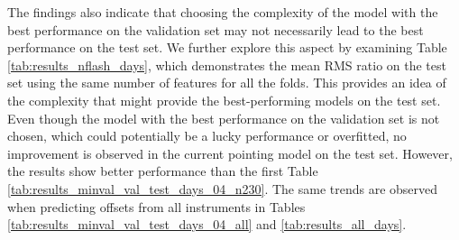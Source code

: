 The findings also indicate that choosing the complexity of the model with the best performance on the validation set may not necessarily lead to the best performance on the test set.
We further explore this aspect by examining Table \ref{tab:results_nflash_days}, which demonstrates the mean RMS ratio on the test set using the same number of features for all the folds.
This provides an idea of the complexity that might provide the best-performing models on the test set.
Even though the model with the best performance on the validation set is not chosen, which could potentially be a lucky performance or overfitted,
no improvement is observed in the current pointing model on the test set.
However, the results show better performance than the first Table \ref{tab:results_minval_val_test_days_04_n230}.
The same trends are observed when predicting offsets from all instruments in Tables \ref{tab:results_minval_val_test_days_04_all} and \ref{tab:results_all_days}. \\


